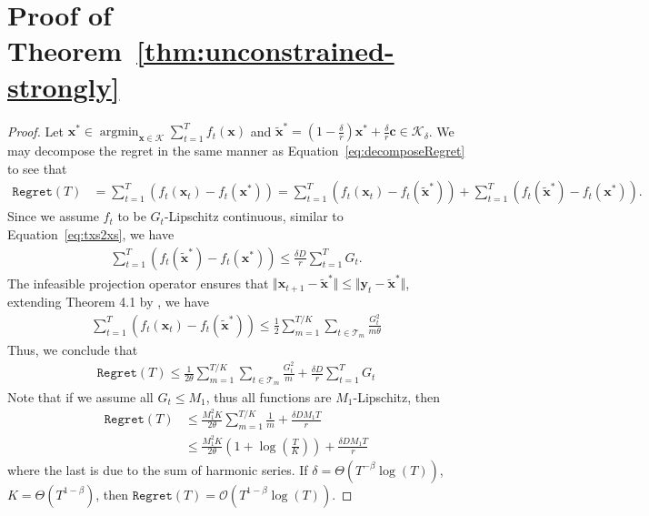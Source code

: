 \documentclass[twoside,11pt,]{article}
\newcommand{\op}[1]{\operatorname{#1}}
\newcommand{\C}[1]{\mathcal{#1}}
\newcommand{\BF}[1]{\mathbf{#1}}
\newcommand{\K}{\C{K}}
\newcommand{\x}{\BF{x}}
\newcommand{\xs}{\x^*}
\newcommand{\txs}{\tilde{\x}^*}
\newcommand{\y}{\BF{y}}
\newcommand{\sumT}{\sum\limits_{t=1}^T}
\renewcommand{\cite}[1]{\citep{#1}}
\begin{document}
\section{Proof of Theorem~\ref{thm:unconstrained-strongly}}
\label{apx:unconstrained-strongly}

\begin{proof}
Let $\xs\in \op{argmin}_{\x\in\K}\sum_{t=1}^T f_t(\x)$ and $\txs=(1-\frac{\delta}{r})\xs+\frac{\delta}{r}{\BF{c}} \in \K_\delta$.
We may decompose the regret in the same manner as Equation~\eqref{eq:decomposeRegret} to see that
\begin{align*}
\mathtt{Regret}(T) &= \sumT \left( f_t(\x_t) - f_t(\xs) \right) 
= \sumT \left( f_t(\x_t) - f_t(\txs) \right) + \sumT \left( f_t(\txs) - f_t(\xs) \right).
\end{align*}
Since we assume $f_t$ to be $G_t$-Lipschitz continuous, similar to Equation~\eqref{eq:txs2xs}, we have
\begin{align}
\label{eq:strconv-lip-cons}
    \sumT \left( f_t(\txs) - f_t(\xs) \right) \leq \frac{\delta D}{r} \sumT G_t.
\end{align}
The infeasible projection operator ensures that $\Vert \x_{t+1}-\txs \Vert \leq \Vert \y_t - \txs \Vert$, extending Theorem 4.1 by \cite{hazan2007adaptive}, we have
\begin{align*}
    \sumT \left( f_t(\x_t) - f_t(\txs) \right) 
    \leq \frac{1}{2} \sum\limits_{m=1}^{T/K} \sum\limits_{t\in\C{T}_m} \frac{G_t^2}{m \theta}
\end{align*}
Thus, we conclude that 
\begin{align*}
    \mathtt{Regret}(T) \leq \frac{1}{2 \theta} \sum\limits_{m=1}^{T/K} \sum\limits_{t\in\C{T}_m} \frac{G_t^2}{m} + \frac{\delta D}{r} \sumT G_t
\end{align*}
Note that if we assume all $G_t\leq M_1$, thus all functions are $M_1$-Lipschitz, then 
\begin{align*}
    \mathtt{Regret}(T) &\leq \frac{M_1^2 K}{2 \theta} \sum\limits_{m=1}^{T/K} \frac{1}{m} + \frac{\delta D M_1 T}{r}  \\
    &\leq \frac{M_1^2 K}{2 \theta} (1+\log(\frac{T}{K})) + \frac{\delta D M_1 T}{r}
\end{align*}
where the last is due to the sum of harmonic series. 
If $\delta = \Theta ( T^{-\beta}\op{log}(T))$, $K=\Theta(T^{1-\beta})$, then $\mathtt{Regret}(T)=\C{O}(T^{1-\beta}\log(T))$.



\end{proof}
\end{document}
